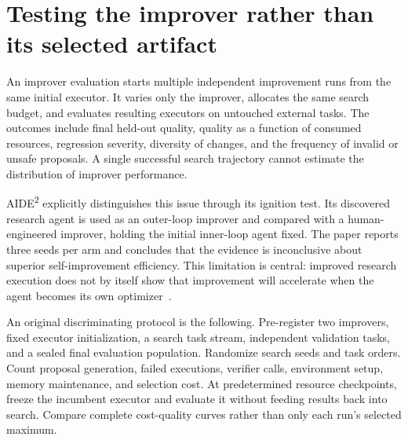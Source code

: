 \section{Testing the improver rather than its selected artifact}\label{sec:C30:06}
An improver evaluation starts multiple independent improvement runs from the same initial executor. It varies only the improver, allocates the same search budget, and evaluates resulting executors on untouched external tasks. The outcomes include final held-out quality, quality as a function of consumed resources, regression severity, diversity of changes, and the frequency of invalid or unsafe proposals. A single successful search trajectory cannot estimate the distribution of improver performance.

AIDE\textsuperscript{2} explicitly distinguishes this issue through its ignition test. Its discovered research agent is used as an outer-loop improver and compared with a human-engineered improver, holding the initial inner-loop agent fixed. The paper reports three seeds per arm and concludes that the evidence is inconclusive about superior self-improvement efficiency. This limitation is central: improved research execution does not by itself show that improvement will accelerate when the agent becomes its own optimizer~\cite{root_aide2026}.

An original discriminating protocol is the following. Pre-register two improvers, fixed executor initialization, a search task stream, independent validation tasks, and a sealed final evaluation population. Randomize search seeds and task orders. Count proposal generation, failed executions, verifier calls, environment setup, memory maintenance, and selection cost. At predetermined resource checkpoints, freeze the incumbent executor and evaluate it without feeding results back into search. Compare complete cost-quality curves rather than only each run's selected maximum.

